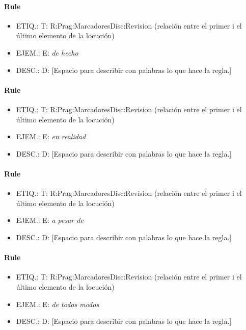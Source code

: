 \documentclass[11pt]{report}
\begin{document}
\paragraph*{Rule}
\begin{itemize}
\item ETIQ.:  T: R:Prag:MarcadoresDisc:Revision (relación entre el primer i el último elemento de la locución)
\item EJEM.:  E: \emph{de hecho}
\item DESC.:  D: [Espacio para describir con palabras lo que hace la regla.]
\end{itemize}

\paragraph*{Rule}
\begin{itemize}
\item ETIQ.:  T: R:Prag:MarcadoresDisc:Revision (relación entre el primer i el último elemento de la locución)
\item EJEM.:  E: \emph{en realidad}
\item DESC.:  D: [Espacio para describir con palabras lo que hace la regla.]
\end{itemize}

\paragraph*{Rule}
\begin{itemize}
\item ETIQ.:  T: R:Prag:MarcadoresDisc:Revision (relación entre el primer i el último elemento de la locución)
\item EJEM.:  E: \emph{a pesar de}
\item DESC.:  D: [Espacio para describir con palabras lo que hace la regla.]
\end{itemize}

\paragraph*{Rule}
\begin{itemize}
\item ETIQ.:  T: R:Prag:MarcadoresDisc:Revision (relación entre el primer i el último elemento de la locución)
\item EJEM.:  E: \emph{de todos modos}
\item DESC.:  D: [Espacio para describir con palabras lo que hace la regla.]
\end{itemize}
\end{document}
